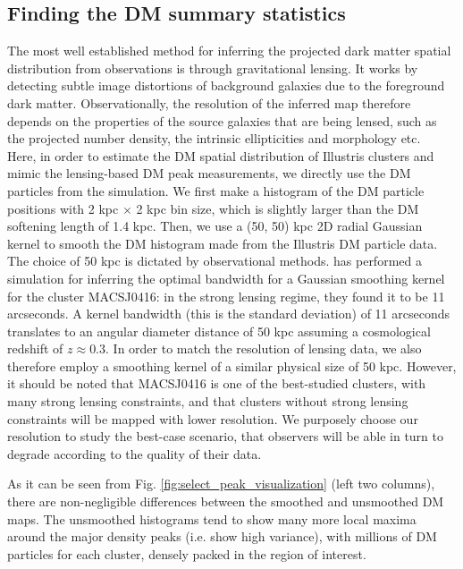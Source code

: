 \documentclass[usenatbib]{mn2e}
\begin{document}
{\subsection{Finding the DM summary statistics}
\label{subsec:DM_map}
The most well established method for inferring the projected dark matter spatial 
distribution from observations is through gravitational lensing.
It works by detecting subtle image distortions of background galaxies due to
the foreground dark matter. Observationally, the resolution of the inferred map therefore 
depends on the properties of the source galaxies that are being lensed, 
such as the projected number density, the intrinsic ellipticities and morphology etc.\\
%
Here, in order to estimate the DM spatial distribution of Illustris clusters and mimic the lensing-based DM peak measurements, we directly use the DM particles from the simulation. We first make a histogram of the DM particle positions with 2 kpc
$\times$ 2 kpc bin size, which is slightly larger than the DM softening length of 1.4 kpc. 
Then, we use a (50, 50) kpc 2D radial Gaussian kernel to smooth the DM histogram made from the Illustris DM
particle data.
The choice of 50 kpc is dictated by observational methods.
\cite{Hoag2016} has performed a simulation for inferring the optimal bandwidth
for a Gaussian smoothing kernel for the cluster MACSJ0416: in the strong lensing regime, they found it to be 11 arcseconds.
A kernel bandwidth (this is the standard deviation) 
of 11 arcseconds translates to an angular diameter distance of 50 
kpc assuming a cosmological redshift of $z \approx 0.3$. 
In order to match the resolution of lensing data,
we also therefore employ a smoothing kernel of a similar physical size of 50 kpc.  However, it should be noted that MACSJ0416 is one of the best-studied clusters, 
with many strong lensing constraints, and that clusters without strong lensing constraints will be mapped with 
lower resolution. We purposely choose our resolution to study the best-case scenario, that observers will be able in turn to degrade according to the quality of their data.

As it can be seen from Fig. \ref{fig:select_peak_visualization} (left two columns), there are non-negligible differences between the smoothed and unsmoothed DM
maps. The unsmoothed histograms tend to show many more local maxima around the major
density peaks (i.e. show high variance), with millions of DM particles for each cluster, densely packed in the region of
interest. \\

}
\end{document}
